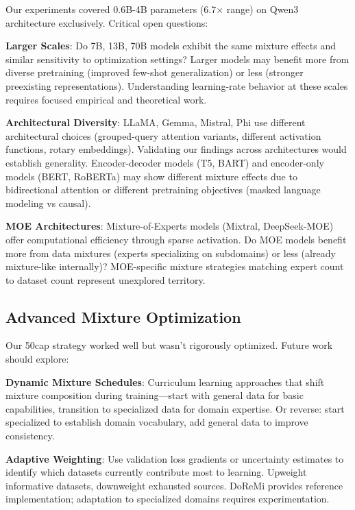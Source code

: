 Our experiments covered 0.6B-4B parameters (6.7$\times$ range) on Qwen3 architecture exclusively. Critical open questions:

\textbf{Larger Scales}: Do 7B, 13B, 70B models exhibit the same mixture effects and similar sensitivity to optimization settings? Larger models may benefit more from diverse pretraining (improved few-shot generalization) or less (stronger preexisting representations). Understanding learning-rate behavior at these scales requires focused empirical and theoretical work.

\textbf{Architectural Diversity}: LLaMA, Gemma, Mistral, Phi use different architectural choices (grouped-query attention variants, different activation functions, rotary embeddings). Validating our findings across architectures would establish generality. Encoder-decoder models (T5, BART) and encoder-only models (BERT, RoBERTa) may show different mixture effects due to bidirectional attention or different pretraining objectives (masked language modeling vs causal).

\textbf{MOE Architectures}: Mixture-of-Experts models (Mixtral, DeepSeek-MOE) offer computational efficiency through sparse activation. Do MOE models benefit more from data mixtures (experts specializing on subdomains) or less (already mixture-like internally)? MOE-specific mixture strategies matching expert count to dataset count represent unexplored territory.

\subsection{Advanced Mixture Optimization}

Our 50cap strategy worked well but wasn't rigorously optimized. Future work should explore:

\textbf{Dynamic Mixture Schedules}: Curriculum learning approaches that shift mixture composition during training—start with general data for basic capabilities, transition to specialized data for domain expertise. Or reverse: start specialized to establish domain vocabulary, add general data to improve consistency.

\textbf{Adaptive Weighting}: Use validation loss gradients or uncertainty estimates to identify which datasets currently contribute most to learning. Upweight informative datasets, downweight exhausted sources. DoReMi \parencite{xie2023doremi} provides reference implementation; adaptation to specialized domains requires experimentation.

